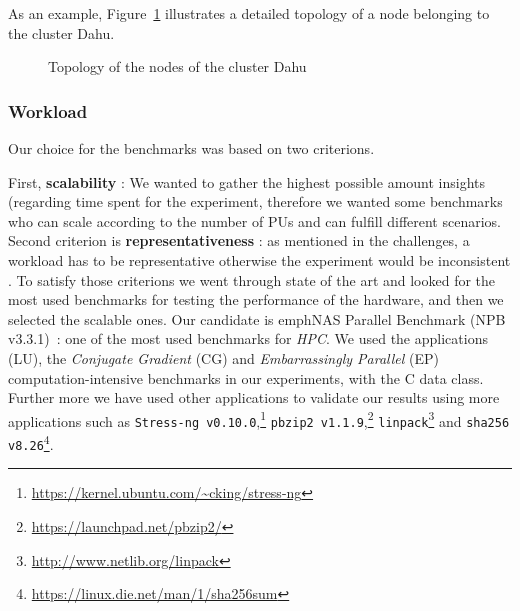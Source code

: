 As an example, Figure~\ref{fig:topo} illustrates a detailed topology of a node belonging to the cluster \textsf{Dahu}.

\begin{figure}%
    \caption{Topology of the nodes of the cluster \textsf{Dahu}}\label{fig:topo}
\end{figure}

\subsubsection{Workload}
Our choice for the benchmarks was based on two criterions.

First, \textbf{scalability} : We wanted to gather the highest possible amount insights (regarding time spent for the experiment, therefore we wanted some benchmarks who can scale according to the number of PUs and can fulfill different scenarios.
Second criterion is \textbf{representativeness} : as mentioned in the challenges, a workload has to be representative otherwise the experiment would be inconsistent \cite{stephen_evaluate_2012}.
To satisfy those criterions we went through state of the art and looked for the most used benchmarks for testing the performance of the hardware, and then we selected the scalable ones.
Our candidate is  emph{NAS Parallel Benchmark} (NPB v3.3.1)~\cite{Bailey:1991:NPB:125826.125925}: one of the most used benchmarks for \emph{HPC}. We used the applications (\textsf{LU}), the \emph{Conjugate Gradient} (\textsf{CG}) and \emph{Embarrassingly Parallel} (\textsf{EP}) computation-intensive benchmarks in our experiments, with the \textsf{C} data class.
Further more we have used other applications to validate our results using more applications such as \texttt{Stress-ng v0.10.0},\footnote{\url{https://kernel.ubuntu.com/~cking/stress-ng}} \texttt{pbzip2 v1.1.9},\footnote{\url{https://launchpad.net/pbzip2/}} \texttt{linpack}\footnote{\url{http://www.netlib.org/linpack}} and \texttt{sha256 v8.26}\footnote{\url{https://linux.die.net/man/1/sha256sum}}.


